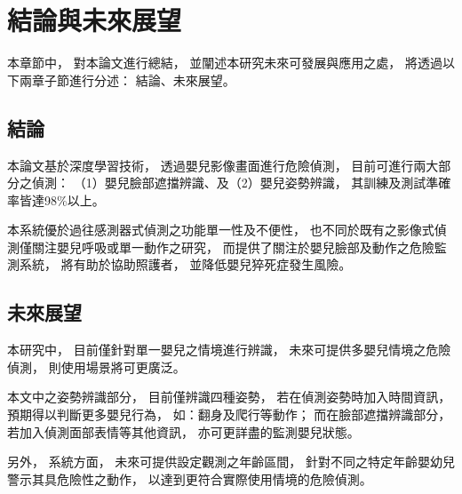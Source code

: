 \documentclass[class=NCU_thesis, crop=false]{standalone}
\begin{document}
\chapter{結論與未來展望}
本章節中，
對本論文進行總結，
並闡述本研究未來可發展與應用之處，
將透過以下兩章子節進行分述：
結論、未來展望。

\section{結論}
本論文基於深度學習技術，
透過嬰兒影像畫面進行危險偵測，
目前可進行兩大部分之偵測：
（1）嬰兒臉部遮擋辨識、及（2）嬰兒姿勢辨識，
其訓練及測試準確率皆達98\%以上。

本系統優於過往感測器式偵測之功能單一性及不便性，
也不同於既有之影像式偵測僅關注嬰兒呼吸或單一動作之研究，
而提供了關注於嬰兒臉部及動作之危險監測系統，
將有助於協助照護者，
並降低嬰兒猝死症發生風險。

\newpage

\section{未來展望}
本研究中，
目前僅針對單一嬰兒之情境進行辨識，
未來可提供多嬰兒情境之危險偵測，
則使用場景將可更廣泛。

本文中之姿勢辨識部分，
目前僅辨識四種姿勢，
若在偵測姿勢時加入時間資訊，
預期得以判斷更多嬰兒行為，
如：翻身及爬行等動作；
而在臉部遮擋辨識部分，
若加入偵測面部表情等其他資訊，
亦可更詳盡的監測嬰兒狀態。

另外，
系統方面，
未來可提供設定觀測之年齡區間，
針對不同之特定年齡嬰幼兒警示其具危險性之動作，
以達到更符合實際使用情境的危險偵測。
\end{document}
